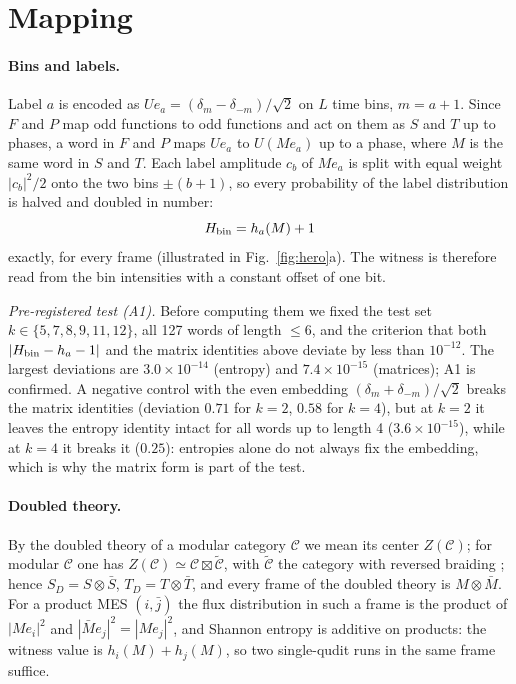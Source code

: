 \documentclass[aps,pra,reprint,superscriptaddress,nofootinbib]{revtex4-2}
\begin{document}
\section{Mapping}
\paragraph*{Bins and labels.}
Label $a$ is encoded as $Ue_a=(\delta_m-\delta_{-m})/\sqrt2$ on $L$ time bins, $m=a+1$.
Since $F$ and $P$ map odd functions to odd functions and act on them as $S$ and $T$ up to phases, a word in $F$ and $P$ maps $Ue_a$ to $U(Me_a)$ up to a phase, where $M$ is the same word in $S$ and $T$.
Each label amplitude $c_b$ of $Me_a$ is split with equal weight $|c_b|^2/2$ onto the two bins $\pm(b+1)$, so every probability of the label distribution is halved and doubled in number:
\begin{equation}
H_{\rm bin}=h_a(M)+1
\end{equation}
exactly, for every frame (illustrated in Fig.~\ref{fig:hero}a). The witness is therefore read from the bin intensities with a constant offset of one bit.

\emph{Pre-registered test (A1).} Before computing them we fixed the test set $k\in\{5,7,8,9,11,12\}$, all 127 words of length $\le6$, and the criterion that both $|H_{\rm bin}-h_a-1|$ and the matrix identities above deviate by less than $10^{-12}$.
The largest deviations are $3.0\times10^{-14}$ (entropy) and $7.4\times10^{-15}$ (matrices); A1 is confirmed.
A negative control with the even embedding $(\delta_m+\delta_{-m})/\sqrt2$ breaks the matrix identities (deviation $0.71$ for $k=2$, $0.58$ for $k=4$), but at $k=2$ it leaves the entropy identity intact for all words up to length 4 ($3.6\times10^{-15}$), while at $k=4$ it breaks it ($0.25$): entropies alone do not always fix the embedding, which is why the matrix form is part of the test.
\paragraph*{Doubled theory.}
By the doubled theory of a modular category $\mathcal C$ we mean its center $Z(\mathcal C)$; for modular $\mathcal C$ one has $Z(\mathcal C)\simeq\mathcal C\boxtimes\tilde{\mathcal C}$, with $\tilde{\mathcal C}$ the category with reversed braiding \cite{Mueger2003}; hence $S_D=S\otimes\bar S$, $T_D=T\otimes\bar T$, and every frame of the doubled theory is $M\otimes\bar M$.
For a product MES $(i,\bar j)$ the flux distribution in such a frame is the product of $|Me_i|^2$ and $|\bar Me_j|^2=|Me_j|^2$, and Shannon entropy is additive on products: the witness value is $h_i(M)+h_j(M)$, so two single-qudit runs in the same frame suffice.
\end{document}
